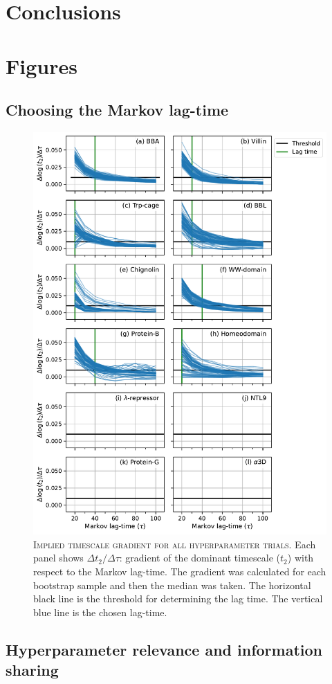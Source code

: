 \documentclass{article}
\begin{document}
\section{Conclusions}

\section{Figures}

\subsection{Choosing the Markov lag-time}

\begin{figure}
    \centering
    \includegraphics[height=0.8\textwidth]{figures/t_2_gradient_sharey_True_log_True_denom_delta_x.pdf}
    \caption{\textsc{Implied timescale gradient for all hyperparameter trials.} Each panel shows $\Delta t_{2}/\Delta \tau$: gradient of the dominant timescale ($t_{2}$) with respect to the Markov lag-time. The gradient was calculated for each bootstrap sample and then the median was taken. The horizontal black line is the threshold for determining the lag time. The vertical blue line is the chosen lag-time.}
    \label{fig:t2_gradient}
\end{figure}


\subsection{Hyperparameter relevance and information sharing}
\end{document}
